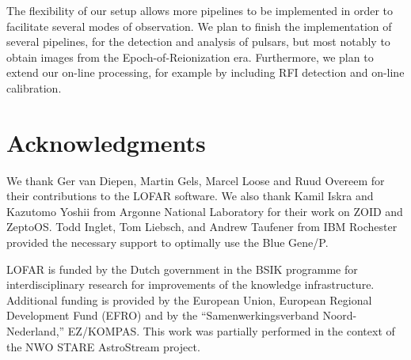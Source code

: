 \documentclass{sig-alternate}
\begin{document}
The flexibility of our setup allows more pipelines to be implemented in order to facilitate several
modes of observation. We plan to finish the implementation of several pipelines, for the detection
and analysis of pulsars, but most notably to obtain images from the Epoch-of-Reionization era. Furthermore,
we plan to extend our on-line processing, for example by including RFI detection and on-line calibration.



\section*{Acknowledgments}

We thank Ger van Diepen, Martin Gels, Marcel Loose and Ruud Overeem
for their contributions to the LOFAR software.
We also thank Kamil Iskra and Kazutomo Yoshii from Argonne National Laboratory
for their work on ZOID and ZeptoOS.
Todd Inglet, Tom Liebsch, and Andrew Taufener from IBM Rochester provided the
necessary support to optimally use the Blue Gene/P.

LOFAR is funded by the Dutch government in the BSIK programme for
interdisciplinary research for improvements of the knowledge
infrastructure.  Additional funding is provided by the European Union,
European Regional Development Fund (EFRO) and by the
``Samenwerkingsverband Noord-Nederland,'' EZ/KOMPAS. This work was
partially performed in the context of the NWO STARE AstroStream
project.



\end{document}
